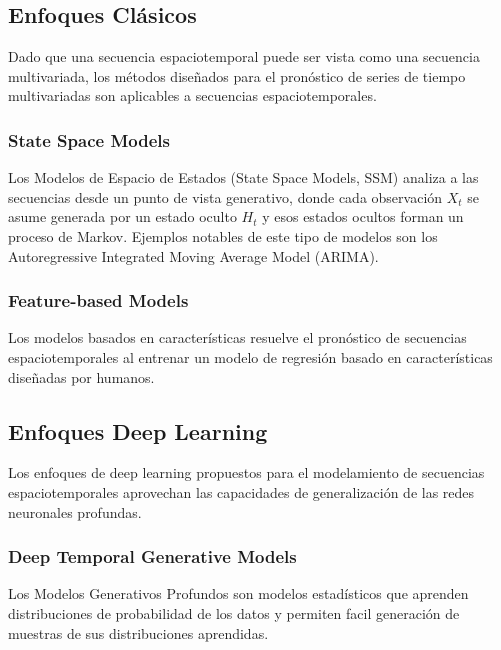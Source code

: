 \subsection{Enfoques Clásicos}
Dado que una secuencia espaciotemporal puede ser vista como una secuencia 
multivariada, los métodos diseñados para el pronóstico de series de tiempo 
multivariadas son aplicables a secuencias espaciotemporales.

\subsubsection{State Space Models}
Los Modelos de Espacio de Estados (State Space Models, SSM) analiza a las 
secuencias desde un punto de vista generativo, donde cada observación $X_t$ se 
asume generada por un estado oculto $H_t$ y esos estados ocultos forman un 
proceso de Markov. Ejemplos notables de este tipo de modelos son los 
Autoregressive Integrated Moving Average Model (ARIMA).

\subsubsection{Feature-based Models}
Los modelos basados en características resuelve el pronóstico de secuencias 
espaciotemporales al entrenar un modelo de regresión basado en características 
diseñadas por humanos.

\subsection{Enfoques Deep Learning}
Los enfoques de deep learning propuestos para el modelamiento de secuencias 
espaciotemporales aprovechan las capacidades de generalización de las redes
neuronales profundas.

\subsubsection{Deep Temporal Generative Models}
Los Modelos Generativos Profundos son modelos estadísticos que aprenden 
distribuciones de probabilidad de los datos y permiten facil generación de 
muestras de sus distribuciones aprendidas.

